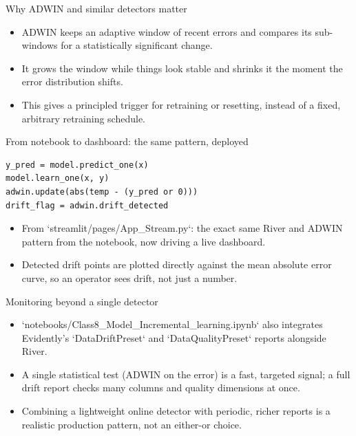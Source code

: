 \begin{frame}{Why ADWIN and similar detectors matter}
\begin{itemize}
\item ADWIN keeps an adaptive window of recent errors and compares its sub-windows for a statistically significant change.
\item It grows the window while things look stable and shrinks it the moment the error distribution shifts.
\item This gives a principled trigger for retraining or resetting, instead of a fixed, arbitrary retraining schedule.
\end{itemize}
\coursefooter
\end{frame}

\begin{frame}[fragile]{From notebook to dashboard: the same pattern, deployed}
\begin{lstlisting}[style=coursepython]
y_pred = model.predict_one(x)
model.learn_one(x, y)
adwin.update(abs(temp - (y_pred or 0)))
drift_flag = adwin.drift_detected
\end{lstlisting}
\begin{itemize}
\item From `streamlit/pages/App_Stream.py`: the exact same River and ADWIN pattern from the notebook, now driving a live dashboard.
\item Detected drift points are plotted directly against the mean absolute error curve, so an operator sees drift, not just a number.
\end{itemize}
\coursefooter
\end{frame}

\begin{frame}{Monitoring beyond a single detector}
\begin{itemize}
\item `notebooks/Class8_Model_Incremental_learning.ipynb` also integrates Evidently's `DataDriftPreset` and `DataQualityPreset` reports alongside River.
\item A single statistical test (ADWIN on the error) is a fast, targeted signal; a full drift report checks many columns and quality dimensions at once.
\item Combining a lightweight online detector with periodic, richer reports is a realistic production pattern, not an either-or choice.
\end{itemize}
\coursefooter
\end{frame}

